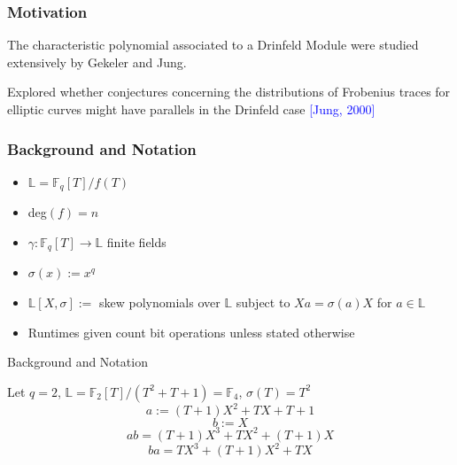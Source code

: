 \documentclass{beamer}
\newcommand{\f}{\mathbb{F}}
\newcommand{\blue}{\textcolor{blue}}
\begin{document}

\begin{frame}

\frametitle{Motivation}

\item The characteristic polynomial associated to a Drinfeld Module were studied extensively by Gekeler and Jung. 

\item Explored whether conjectures concerning the distributions of Frobenius traces for elliptic curves might have parallels in the Drinfeld case \blue{[Jung, 2000]}


    
\end{frame}




\begin{frame}
\frametitle{Background and Notation}

\begin{itemize}

\item $\mathbb{L} = \mathbb{F}_q[T]/f(T)$
\item deg$(f) = n$
\item $\gamma: \mathbb{F}_q[T] \to \mathbb{L}$ finite fields
\item $\sigma(x) := x^q$
\item $\mathbb{L}[X,\sigma] := $ skew polynomials over $\mathbb{L}$ subject to $Xa = \sigma(a)X$ for $a \in \mathbb{L}$ 
\item Runtimes given count bit operations unless stated otherwise

\end{itemize}
\end{frame}
\begin{frame}{Background and Notation}


\begin{example}
Let $q = 2$, $\mathbb{L} = \mathbb{F}_2[T]/(T^2 + T + 1) = \mathbb{F}_4$, $\sigma(T) = T^2$
\[ a:= (T + 1)X^2 + TX + T + 1 \]
\[b := X\]
\[ab = (T + 1)X^3 + TX^2 + (T + 1)X\]
\[ba = TX^3 + (T+1)X^2 + TX \]
\end{example}



\end{frame}
\end{document}

